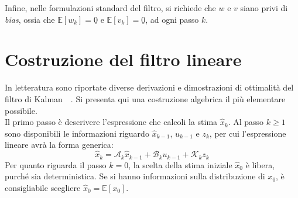 \documentclass[12pt,a4paper,openright,twoside]{book}
\begin{document}
Infine, nelle formulazioni standard del filtro, si richiede che $w$ e $v$ siano privi di \textit{bias}, ossia che $\mathbb{E}[w_k]=\underline{0}$ e $\mathbb{E}[v_k]=\underline{0}$, ad ogni passo $k$.

\section{Costruzione del filtro lineare}

In letteratura sono riportate diverse derivazioni e dimostrazioni di ottimalità del filtro di Kalman~\cite[pp.~107-113]{10.5555/2823801}~\cite{10.48550/arXiv.1910.03558}. Si presenta qui una costruzione algebrica il più elementare possibile. \\

Il primo passo è descrivere l'espressione che calcoli la stima $\hat{x}_k$. Al passo $k\geq 1$ sono disponibili le informazioni riguardo $\hat{x}_{k-1}$, $u_{k-1}$ e $z_k$, per cui l'espressione lineare avrà la forma generica:
\begin{equation} \label{eq:generic-estimate}
\hat{x}_k=\mathcal{A}_k\hat{x}_{k-1}+\mathcal{B}_ku_{k-1}+\mathcal{K}_kz_k
\end{equation}
Per quanto riguarda il passo $k=0$, la scelta della stima iniziale $\hat{x}_0$ è libera, purché sia deterministica. Se si hanno informazioni sulla distribuzione di $x_0$, è consigliabile scegliere $\hat{x}_0=\mathbb{E}[x_0]$. \\
\end{document}
